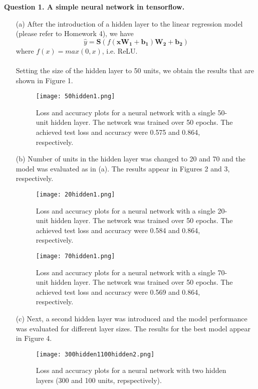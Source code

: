 \documentclass[12pt]{article}
\begin{document}
\noindent
\noindent\textbf{Question 1. A simple neural network in tensorflow.}
\begin{enumerate}
    \item[(a)] After the introduction of a hidden layer to the linear regression model (please refer to Homework 4),
    we have
    \[
      \hat{y} = \boldsymbol{S}\left(f\left(\boldsymbol{xW_{1}} + \boldsymbol{b_{1}}\right)\boldsymbol{W_{2}} + \boldsymbol{b_{2}}\right)
    \] 
    where $f(x)=max(0, x)$, i.e. ReLU.\\
    \\
    Setting the size of the hidden layer to 50 units, we obtain the results that are shown in Figure 1.
    \begin{figure}[h]
        \centering
        \texttt{[image: 50hidden1.png]}
        \caption{Loss and accuracy plots for a neural network with a single 50-unit hidden layer. 
        The network was trained over 50 epochs. The achieved test loss and accuracy were 0.575 and 0.864, respectively.}
    \end{figure}
    \item[(b)] Number of units in the hidden layer was changed to 20 and 70 and the model was evaluated as in (a). The results appear in Figures 2 and 3, respectively.
    \begin{figure}[h!]
        \centering
        \texttt{[image: 20hidden1.png]}
        \caption{Loss and accuracy plots for a neural network with a single 20-unit hidden layer. 
        The network was trained over 50 epochs. The achieved test loss and accuracy were 0.584 and 0.864, respectively.}
    \end{figure}
    \begin{figure}[h!]
        \centering
        \texttt{[image: 70hidden1.png]}
        \caption{Loss and accuracy plots for a neural network with a single 70-unit hidden layer. 
        The network was trained over 50 epochs. The achieved test loss and accuracy were 0.569 and 0.864, respectively.}
    \end{figure}
    \item[(c)] Next, a second hidden layer was introduced and the model performance was evaluated for different layer sizes. The results for the best model appear in Figure 4.
    \begin{figure}[h!]
        \centering
        \texttt{[image: 300hidden1100hidden2.png]}
        \caption{Loss and accuracy plots for a neural network with two hidden layers (300 and 100 units, repspectively). 
}
\end{figure}
\end{enumerate}
\end{document}
